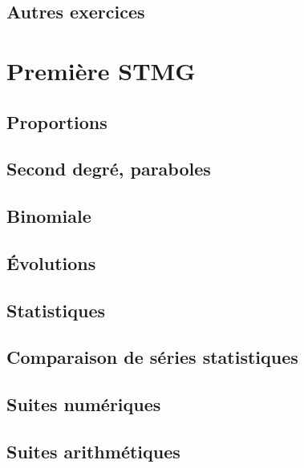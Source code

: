 \documentclass[a4paper,10pt]{book}
\begin{document}
\chapter{Autres exercices}



\part{Première STMG}

\chapter{Proportions}


\chapter{Second degré, paraboles}


\chapter{Binomiale}


\chapter{Évolutions}


\chapter{Statistiques}


\chapter{Comparaison de séries statistiques}


\chapter{Suites numériques}


\chapter{Suites arithmétiques}

\end{document}
